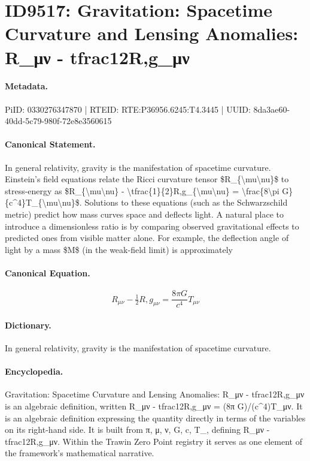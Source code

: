 \section*{ID9517: Gravitation: Spacetime Curvature and Lensing Anomalies: R\_μν - tfrac12R,g\_μν}
\paragraph{Metadata.}
PiID: 0330276347870 | RTEID: RTE:P36956.6245:T4.3445 | UUID: 8da3ae60-40dd-5c79-980f-72e8e3560615

\paragraph{Canonical Statement.}
In general relativity, gravity is the manifestation of spacetime curvature. Einstein’s field equations relate the Ricci curvature tensor \$R\_\{\textbackslash{}mu\textbackslash{}nu\}\$ to stress-energy as \$R\_\{\textbackslash{}mu\textbackslash{}nu\} - \textbackslash{}tfrac\{1\}\{2\}R,g\_\{\textbackslash{}mu\textbackslash{}nu\} = \textbackslash{}frac\{8\textbackslash{}pi G\}\{c\textasciicircum{}4\}T\_\{\textbackslash{}mu\textbackslash{}nu\}\$. Solutions to these equations (such as the Schwarzschild metric) predict how mass curves space and deflects light. A natural place to introduce a dimensionless ratio is by comparing observed gravitational effects to predicted ones from visible matter alone. For example, the deflection angle of light by a mass \$M\$ (in the weak-field limit) is approximately

\paragraph{Canonical Equation.}
\[
R_{\mu\nu} - \tfrac{1}{2}R,g_{\mu\nu} = \frac{8\pi G}{c^4}T_{\mu\nu}
\]

\paragraph{Dictionary.}
In general relativity, gravity is the manifestation of spacetime curvature.

\paragraph{Encyclopedia.}
Gravitation: Spacetime Curvature and Lensing Anomalies: R\_μν - tfrac12R,g\_μν is an algebraic definition, written R\_μν - tfrac12R,g\_μν = (8π G)/(c\textasciicircum{}4)T\_μν. It is an algebraic definition expressing the quantity directly in terms of the variables on its right-hand side. It is built from π, μ, ν, G, c, T\_, defining R\_μν - tfrac12R,g\_μν. Within the Trawin Zero Point registry it serves as one element of the framework's mathematical narrative.
